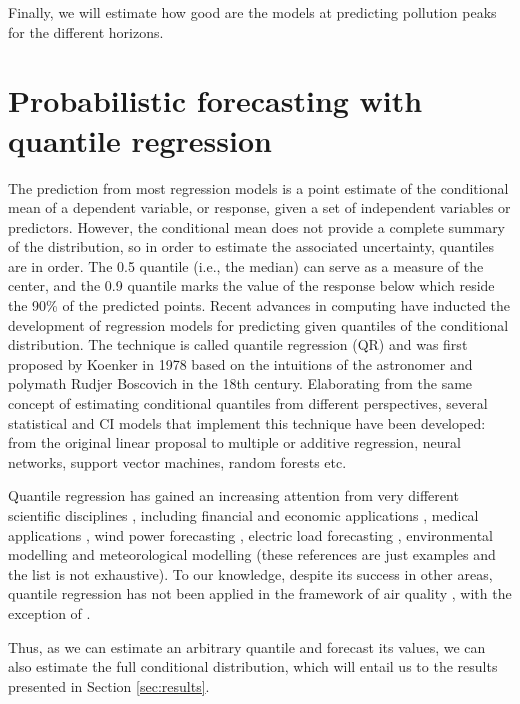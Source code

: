\documentclass[a4paper,twocolumn,5p]{elsarticle}
\begin{document}
Finally, we will estimate how good are the models at predicting 
pollution peaks for the different horizons.

\section{Probabilistic forecasting with quantile regression}
\label{sec:probForec}

The prediction from most regression models is a
point estimate of the conditional mean of a dependent variable, or
response, given a set of independent variables or predictors. However,
the conditional mean does not provide a complete summary
of the distribution, so in order to estimate the associated
uncertainty, quantiles are in order. The 0.5 quantile (i.e., the
median) can serve as a measure of the center, and the 0.9 quantile
marks the value of the response below which reside the 90\% of the
predicted points. Recent advances in computing have inducted the
development of regression models for predicting given quantiles of the
conditional distribution. The technique is called quantile regression
(QR) and was first proposed by Koenker in 1978
\cite{koenker_quantile_2001} based on the intuitions of the
astronomer and polymath Rudjer Boscovich in the 18th
century. Elaborating from the same concept of estimating conditional
quantiles from different perspectives, several statistical and CI
models that implement this technique have been developed: from the
original linear proposal to multiple or additive regression, neural
networks, support vector machines, random forests etc.

Quantile regression has gained an increasing attention from very
different scientific disciplines \cite{yu_quantile_2003}, including
financial and economic applications \cite{ben_rejeb_financial_2016},
medical applications \cite{jang_quantile_2018}, wind power
forecasting \cite{wan_direct_2017}, electric load forecasting
\cite{lebotsa_short_2018}, environmental modelling
\cite{cade_gentle_2003} and meteorological modelling
\cite{baur_modelling_2004} (these references are just
examples and the list is not exhaustive). To our knowledge, despite
its success in other areas, quantile regression has not been applied
in the framework of air quality , with the exception of
 \cite{martinezsilva_forecasting_2016}.

Thus, as we can estimate an arbitrary quantile and forecast its
values, we can also estimate the full conditional distribution, which
will entail us to the results presented in Section \ref{sec:results}.
\end{document}
